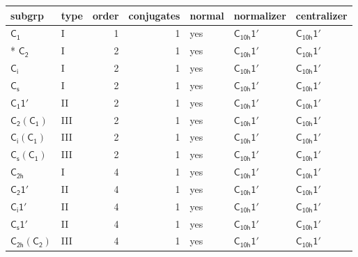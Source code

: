 \documentclass[10pt,a4paper]{article}
\numberwithin{equation}{section}
\newcommand{\grp}[1]{\mathsf{#1}}
\begin{document}
{\small\begin{longtable}{@{}llrrlll@{}}\toprule
subgrp & type & order & conjugates & normal & normalizer & centralizer\\\midrule\endhead
\bottomrule\endfoot\endlastfoot
\href{../../../rotation/data/pdf/C1.pdf}{$\grp{C_{1}}$} & I & 1 & 1 & yes & \href{C10h-1p.pdf}{$\grp{C_{10h}1'}$} & \href{C10h-1p.pdf}{$\grp{C_{10h}1'}$}\\*
\href{../../../rotation/data/pdf/C2.pdf}{$\grp{C_{2}}$} & I & 2 & 1 & yes & \href{C10h-1p.pdf}{$\grp{C_{10h}1'}$} & \href{C10h-1p.pdf}{$\grp{C_{10h}1'}$}\\
\href{../../../rotation/data/pdf/S2.pdf}{$\grp{C_{i}}$} & I & 2 & 1 & yes & \href{C10h-1p.pdf}{$\grp{C_{10h}1'}$} & \href{C10h-1p.pdf}{$\grp{C_{10h}1'}$}\\
\href{../../../rotation/data/pdf/C1v.pdf}{$\grp{C_{s}}$} & I & 2 & 1 & yes & \href{C10h-1p.pdf}{$\grp{C_{10h}1'}$} & \href{C10h-1p.pdf}{$\grp{C_{10h}1'}$}\\
\href{C1-1p.pdf}{$\grp{C_{1}1'}$} & II & 2 & 1 & yes & \href{C10h-1p.pdf}{$\grp{C_{10h}1'}$} & \href{C10h-1p.pdf}{$\grp{C_{10h}1'}$}\\
\href{C2-C1.pdf}{$\grp{C_{2}}(\grp{C_{1}})$} & III & 2 & 1 & yes & \href{C10h-1p.pdf}{$\grp{C_{10h}1'}$} & \href{C10h-1p.pdf}{$\grp{C_{10h}1'}$}\\
\href{S2-C1.pdf}{$\grp{C_{i}}(\grp{C_{1}})$} & III & 2 & 1 & yes & \href{C10h-1p.pdf}{$\grp{C_{10h}1'}$} & \href{C10h-1p.pdf}{$\grp{C_{10h}1'}$}\\
\href{C1v-C1.pdf}{$\grp{C_{s}}(\grp{C_{1}})$} & III & 2 & 1 & yes & \href{C10h-1p.pdf}{$\grp{C_{10h}1'}$} & \href{C10h-1p.pdf}{$\grp{C_{10h}1'}$}\\
\href{../../../rotation/data/pdf/C2h.pdf}{$\grp{C_{2h}}$} & I & 4 & 1 & yes & \href{C10h-1p.pdf}{$\grp{C_{10h}1'}$} & \href{C10h-1p.pdf}{$\grp{C_{10h}1'}$}\\
\href{C2-1p.pdf}{$\grp{C_{2}1'}$} & II & 4 & 1 & yes & \href{C10h-1p.pdf}{$\grp{C_{10h}1'}$} & \href{C10h-1p.pdf}{$\grp{C_{10h}1'}$}\\
\href{S2-1p.pdf}{$\grp{C_{i}1'}$} & II & 4 & 1 & yes & \href{C10h-1p.pdf}{$\grp{C_{10h}1'}$} & \href{C10h-1p.pdf}{$\grp{C_{10h}1'}$}\\
\href{C1v-1p.pdf}{$\grp{C_{s}1'}$} & II & 4 & 1 & yes & \href{C10h-1p.pdf}{$\grp{C_{10h}1'}$} & \href{C10h-1p.pdf}{$\grp{C_{10h}1'}$}\\
\href{C2h-C2.pdf}{$\grp{C_{2h}}(\grp{C_{2}})$} & III & 4 & 1 & yes & \href{C10h-1p.pdf}{$\grp{C_{10h}1'}$} & \href{C10h-1p.pdf}{$\grp{C_{10h}1'}$}\\

\end{longtable}}
\end{document}
